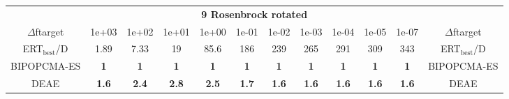 \begin{tabular}{cccccccccccc}
 & \multicolumn{10}{c}{{\normalsize \textbf{9 Rosenbrock rotated}}}\\
$\Delta$ftarget& 1e+03& 1e+02& 1e+01& 1e+00& 1e-01& 1e-02& 1e-03& 1e-04& 1e-05& 1e-07 & $\Delta$ftarget \\
ERT$_{\textrm{best}}$/D& 1.89& 7.33& 19& 85.6& 186& 239& 265& 291& 309& 343 & ERT$_{\textrm{best}}$/D \\
\hline
BIPOPCMA-ES & \textbf{1} & \textbf{1} & \textbf{1} & \textbf{1} & \textbf{1} & \textbf{1} & \textbf{1} & \textbf{1} & \textbf{1} & \textbf{1} & BIPOPCMA-ES \cite{add_an_entry_for_BIPOPCMA-ES_in_bbob.bib}\\
DEAE & \textbf{1.6} & \textbf{2.4} & \textbf{2.8} & \textbf{2.5} & \textbf{1.7} & \textbf{1.6} & \textbf{1.6} & \textbf{1.6} & \textbf{1.6} & \textbf{1.6} & DEAE \cite{add_an_entry_for_DEAE_in_bbob.bib}
\end{tabular}
